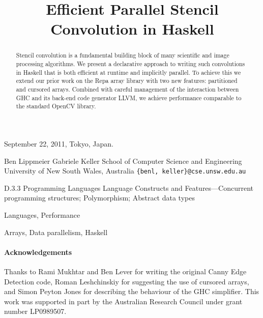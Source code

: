 \documentclass[preprint]{sigplanconf}
\begin{document}
 {September 22, 2011, Tokyo, Japan.}

\title	{Efficient Parallel Stencil Convolution in Haskell}

\authorinfo
	{Ben Lippmeier \quad \quad Gabriele Keller}
	{School of Computer Science and Engineering \\
	 University of New South Wales, Australia}
	{\texttt{\{benl, keller\}@cse.unsw.edu.au}}

\maketitle
\makeatactive


\begin{abstract}
Stencil convolution is a fundamental building block of many scientific and image processing algorithms. We present a declarative approach to writing such convolutions in Haskell that is both efficient at runtime and implicitly parallel. To achieve this we extend our prior work on the Repa array library with two new features: partitioned and cursored arrays. Combined with careful management of the interaction between GHC and its back-end code generator LLVM, we achieve performance comparable to the standard OpenCV library.
\end{abstract}

\category
	{D.3.3}
	{Programming Languages}
	{Language Constructs and Features---Concurrent programming structures; Polymorphism; Abstract data types}

\terms
	Languages, Performance

\keywords
	Arrays, Data parallelism, Haskell












\paragraph{Acknowledgements}
Thanks to Rami Mukhtar and Ben Lever for writing the original Canny Edge Detection code, Roman Leshchinskiy for suggesting the use of cursored arrays, and Simon Peyton Jones for describing the behaviour of the GHC simplifier.
This work was supported in part by the Australian Research Council under grant number LP0989507.



\end{document}
